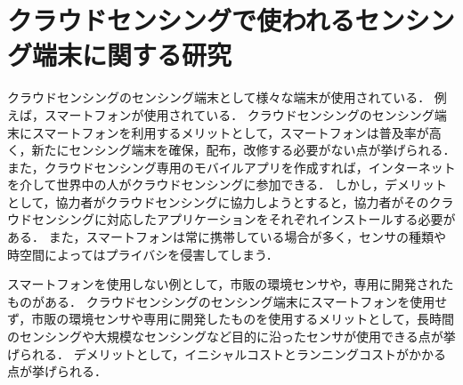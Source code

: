 \section{クラウドセンシングで使われるセンシング端末に関する研究}
\label{sec:format_abst}
クラウドセンシングのセンシング端末として様々な端末が使用されている．
例えば，スマートフォンが使用されている\cite{ura}\cite{hoso}\cite{Tangmunarunkit}\cite{ohmage}\cite{Ferreira}\cite{AWARE}．
クラウドセンシングのセンシング端末にスマートフォンを利用するメリットとして，スマートフォンは普及率が高く，新たにセンシング端末を確保，配布，改修する必要がない点が挙げられる．
また，クラウドセンシング専用のモバイルアプリを作成すれば，インターネットを介して世界中の人がクラウドセンシングに参加できる．
しかし，デメリットとして，協力者がクラウドセンシングに協力しようとすると，協力者がそのクラウドセンシングに対応したアプリケーションをそれぞれインストールする必要がある．
また，スマートフォンは常に携帯している場合が多く，センサの種類や時空間によってはプライバシを侵害してしまう．

スマートフォンを使用しない例として，市販の環境センサや，専用に開発されたものがある\cite{paku}\cite{weko}\cite{amedas}\cite{S-net}．
クラウドセンシングのセンシング端末にスマートフォンを使用せず，市販の環境センサや専用に開発したものを使用するメリットとして，長時間のセンシングや大規模なセンシングなど目的に沿ったセンサが使用できる点が挙げられる．
デメリットとして，イニシャルコストとランニングコストがかかる点が挙げられる．



